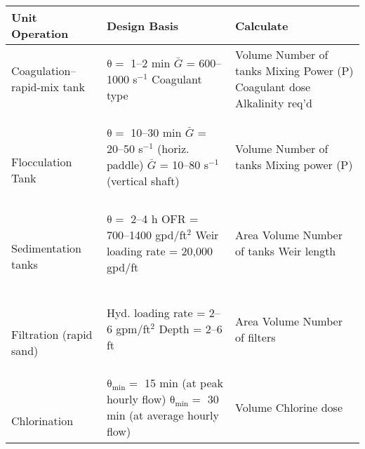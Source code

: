\documentclass[11pt,letterpaper]{article}
\begin{document}
\vspace{0.2in}


\begin{minipage}{\linewidth}
\centering
{} \label{tab:title}

\begin{tabular}{|p{50mm}|p{70mm}|p{30mm}|}\toprule[1.25pt]
\bf Unit Operation	& \bf Design Basis 	& \bf Calculate	\\\midrule
Coagulation--rapid-mix tank	& $\mathrm{\theta =}$ 1--2 min \newline $\bar{G}$ = 600--1000 s$^{-1}$ \newline Coagulant type & Volume \newline Number of tanks \newline Mixing Power (P) \newline Coagulant dose \newline Alkalinity req'd\\ \hline\

Flocculation Tank 	& $\mathrm{\theta =}$ 10--30 min \newline $\bar{G}$ = 20--50 s$^{-1}$ (horiz. paddle) \newline $\bar{G}$ = 10--80 s$^{-1}$ (vertical shaft)	& Volume \newline Number of tanks \newline Mixing power (P)\\ \hline\

Sedimentation tanks & $\mathrm{\theta =}$ 2--4 h \newline OFR = 700--1400 gpd/ft$^2$ \newline Weir loading rate = 20,000 gpd/ft & Area \newline Volume \newline Number of tanks \newline Weir length\\ \hline\

Filtration (rapid sand) & Hyd. loading rate = 2--6 gpm/ft$^2$ \newline Depth = 2--6 ft & Area \newline Volume \newline Number of filters\\ \hline\

Chlorination & $\mathrm{\theta_{min} =}$ 15 min (at peak hourly flow) \newline $\mathrm{\theta_{min} =}$ 30 min (at average hourly flow) & Volume \newline Chlorine dose\\ 


\bottomrule[1.25pt]

\end {tabular}\par
\end{minipage}\\
\end{document}
